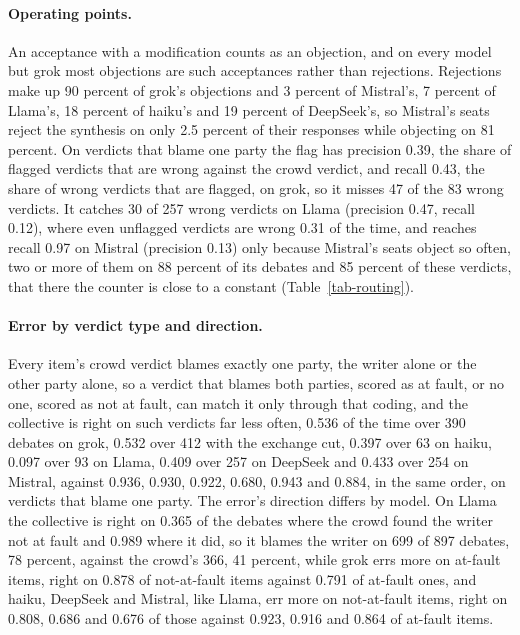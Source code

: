 \paragraph{Operating points.}
An acceptance with a modification counts as an objection, and on every model
but grok most objections are such acceptances rather than rejections.
Rejections make up 90 percent of grok's
objections and 3 percent of Mistral's, 7 percent of Llama's, 18 percent of
haiku's and 19 percent of DeepSeek's, so Mistral's seats reject the
synthesis on only 2.5 percent of their responses while objecting on 81
percent.
On verdicts that blame one party the flag has precision 0.39, the share of
flagged verdicts that are wrong against the crowd verdict, and recall 0.43, the
share of wrong verdicts that are flagged, on grok, so it misses 47 of the 83
wrong verdicts. It catches 30 of 257 wrong verdicts on Llama (precision 0.47,
recall 0.12), where even unflagged verdicts are wrong 0.31 of the time, and
reaches recall 0.97 on Mistral (precision 0.13) only because Mistral's seats
object so often, two or more of them on 88 percent of its debates and 85
percent of these verdicts, that there the counter is close to a constant
(Table~\ref{tab-routing}).

\paragraph{Error by verdict type and direction.}
Every item's crowd verdict blames exactly one party, the writer alone or the
other party alone, so a verdict that blames both parties, scored as at fault,
or no one, scored as not at fault, can match it only through that coding, and
the collective is right on such verdicts far less often, 0.536 of the time
over 390 debates on grok, 0.532 over 412 with the exchange cut, 0.397 over 63
on haiku, 0.097 over 93 on Llama, 0.409 over 257 on DeepSeek and 0.433 over
254 on Mistral, against
0.936, 0.930, 0.922, 0.680, 0.943 and 0.884, in the same order, on verdicts
that blame one party.
The error's direction differs by model. On Llama the collective is right on
0.365 of the debates where the crowd found the writer not at fault and 0.989
where it did, so it blames the writer on 699 of 897 debates, 78 percent,
against the crowd's 366, 41 percent, while grok errs more on at-fault items,
right on 0.878 of not-at-fault items against 0.791 of at-fault ones, and
haiku, DeepSeek and Mistral, like Llama, err more on not-at-fault items,
right on 0.808, 0.686 and 0.676 of those against 0.923, 0.916 and 0.864 of
at-fault items.

